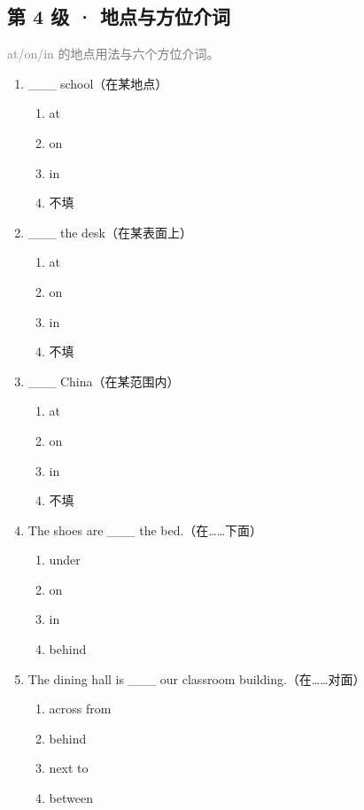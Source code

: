 \documentclass[11pt,a4paper]{ctexart}
\begin{document}
\subsection*{第 4 级 · 地点与方位介词}
\noindent\textcolor{gray}{at/on/in 的地点用法与六个方位介词。}\par\smallskip
\begin{enumerate}[leftmargin=*,itemsep=4pt]
\item \_\_\_ school（在某地点）
\begin{enumerate}[label=\Alph*.,leftmargin=2em,itemsep=1pt,topsep=2pt]
\item at
\item on
\item in
\item 不填
\end{enumerate}
\item \_\_\_ the desk（在某表面上）
\begin{enumerate}[label=\Alph*.,leftmargin=2em,itemsep=1pt,topsep=2pt]
\item at
\item on
\item in
\item 不填
\end{enumerate}
\item \_\_\_ China（在某范围内）
\begin{enumerate}[label=\Alph*.,leftmargin=2em,itemsep=1pt,topsep=2pt]
\item at
\item on
\item in
\item 不填
\end{enumerate}
\item The shoes are \_\_\_ the bed.（在……下面）
\begin{enumerate}[label=\Alph*.,leftmargin=2em,itemsep=1pt,topsep=2pt]
\item under
\item on
\item in
\item behind
\end{enumerate}
\item The dining hall is \_\_\_ our classroom building.（在……对面）
\begin{enumerate}[label=\Alph*.,leftmargin=2em,itemsep=1pt,topsep=2pt]
\item across from
\item behind
\item next to
\item between

\end{enumerate}
\end{enumerate}
\end{document}
